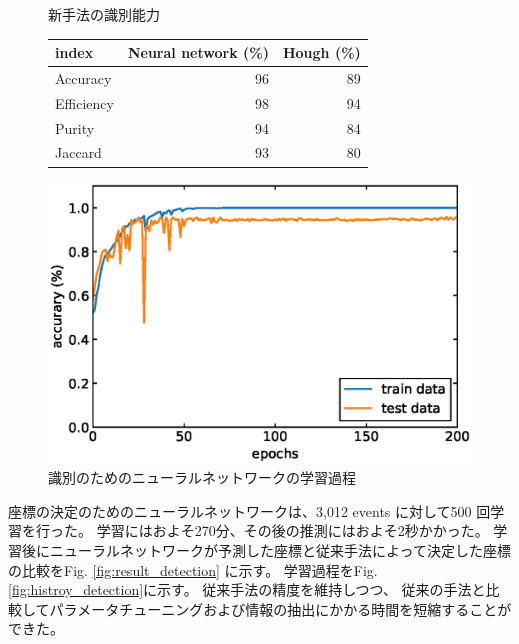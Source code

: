 \documentclass{jps-cp}
\makeatletter
\newcommand{\tblcaption}[1]{\def\@captype{table}\caption{#1}}
\makeatother
\begin{document}
\begin{figure}
  \begin{minipage}{0.4\columnwidth}
    \centering
    \tblcaption{新手法の識別能力}
    \label{tab:result_selection}
    \begin{tabular}{lrr}
      \toprule
      index & Neural network (\%) & Hough (\%) \\ \midrule
      Accuracy & 96 & 89 \\
      Efficiency & 98 & 94 \\
      Purity & 94 & 84 \\
      Jaccard & 93 & 80 \\ \bottomrule
    \end{tabular}
  \end{minipage}
  \hfill
  \begin{minipage}{0.4\columnwidth}
    \centering
    \includegraphics[clip,width=\columnwidth]{eps/event_selection_history.eps}
    \caption{識別のためのニューラルネットワークの学習過程}
    \label{fig:history_selection}
  \end{minipage}
\end{figure}

座標の決定のためのニューラルネットワークは、3,012 events に対して500 回学習を行った。
学習にはおよそ270分、その後の推測にはおよそ2秒かかった。
学習後にニューラルネットワークが予測した座標と従来手法によって決定した座標の比較をFig. \ref{fig:result_detection} に示す。
学習過程をFig. \ref{fig:histroy_detection}に示す。
従来手法の精度を維持しつつ、
従来の手法と比較してパラメータチューニングおよび情報の抽出にかかる時間を短縮することができた。
\end{document}
